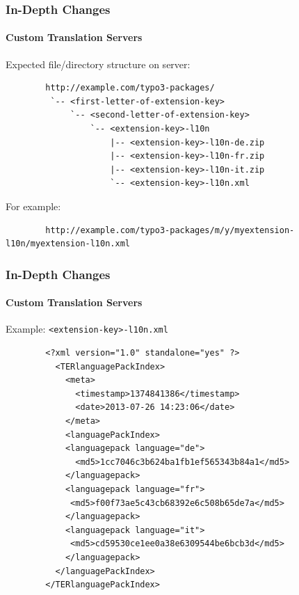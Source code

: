 
\begin{frame}[fragile]
	\frametitle{In-Depth Changes}
	\framesubtitle{Custom Translation Servers}

	Expected file/directory structure on server:

	\begin{lstlisting}
		http://example.com/typo3-packages/
		 `-- <first-letter-of-extension-key>
		     `-- <second-letter-of-extension-key>
		         `-- <extension-key>-l10n
		             |-- <extension-key>-l10n-de.zip
		             |-- <extension-key>-l10n-fr.zip
		             |-- <extension-key>-l10n-it.zip
		             `-- <extension-key>-l10n.xml
	\end{lstlisting}

	For example:

	\begin{lstlisting}
		http://example.com/typo3-packages/m/y/myextension-l10n/myextension-l10n.xml
	\end{lstlisting}

\end{frame}


\begin{frame}[fragile]
	\frametitle{In-Depth Changes}
	\framesubtitle{Custom Translation Servers}

	Example: \texttt{<extension-key>-l10n.xml}

	\lstset{
		basicstyle=\tiny\ttfamily
	}

	\begin{lstlisting}
		<?xml version="1.0" standalone="yes" ?>
		  <TERlanguagePackIndex>
		    <meta>
		      <timestamp>1374841386</timestamp>
		      <date>2013-07-26 14:23:06</date>
		    </meta>
		    <languagePackIndex>
		    <languagepack language="de">
		      <md5>1cc7046c3b624ba1fb1ef565343b84a1</md5>
		    </languagepack>
		    <languagepack language="fr">
		     <md5>f00f73ae5c43cb68392e6c508b65de7a</md5>
		    </languagepack>
		    <languagepack language="it">
		     <md5>cd59530ce1ee0a38e6309544be6bcb3d</md5>
		    </languagepack>
		  </languagePackIndex>
		</TERlanguagePackIndex>
	\end{lstlisting}

\end{frame}

